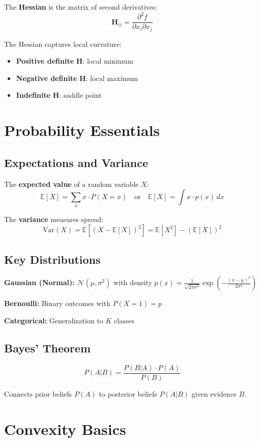 \documentclass[../main.tex]{subfiles}
\begin{document}
The \textbf{Hessian} is the matrix of second derivatives:
\[
\mathbf{H}_{ij} = \frac{\partial^2 f}{\partial x_i \partial x_j}
\]

The Hessian captures local curvature:
\begin{itemize}
    \item \textbf{Positive definite} $\mathbf{H}$: local minimum
    \item \textbf{Negative definite} $\mathbf{H}$: local maximum
    \item \textbf{Indefinite} $\mathbf{H}$: saddle point
\end{itemize}

\section*{Probability Essentials}

\subsection*{Expectations and Variance}

The \textbf{expected value} of a random variable $X$:
\[
\mathbb{E}[X] = \sum_x x \cdot P(X=x) \quad \text{or} \quad \mathbb{E}[X] = \int x \cdot p(x) \, dx
\]

The \textbf{variance} measures spread:
\[
\text{Var}(X) = \mathbb{E}[(X - \mathbb{E}[X])^2] = \mathbb{E}[X^2] - (\mathbb{E}[X])^2
\]

\subsection*{Key Distributions}

\textbf{Gaussian (Normal):} $\mathcal{N}(\mu, \sigma^2)$ with density $p(x) = \frac{1}{\sqrt{2\pi\sigma^2}} \exp\left(-\frac{(x-\mu)^2}{2\sigma^2}\right)$

\textbf{Bernoulli:} Binary outcomes with $P(X=1) = p$

\textbf{Categorical:} Generalization to $K$ classes

\subsection*{Bayes' Theorem}

\[
P(A|B) = \frac{P(B|A) \cdot P(A)}{P(B)}
\]

Connects prior beliefs $P(A)$ to posterior beliefs $P(A|B)$ given evidence $B$.

\section*{Convexity Basics}
\end{document}
